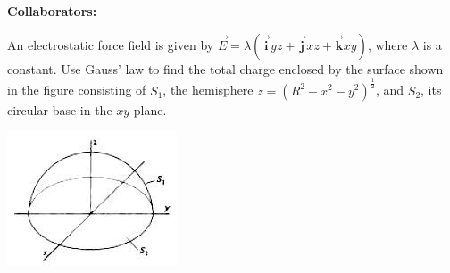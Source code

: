 \documentclass[11pt,letterpaper,boxed]{hmcpset}
\begin{document}
	
	\noindent\textbf{Collaborators:} 
	
	
	\begin{problem}[Schey II-8] 
		An electrostatic force field is given by $\vec{E} = \lambda (\vec{\textbf{i}}yz + \vec{\textbf{j}}xz + \vec{\textbf{k}}xy)$, where $\lambda$ is a constant. Use Gauss' law to find the total charge enclosed by the surface shown in the figure consisting of $S_1$, the hemisphere $z = (R^2 - x^2 - y^2)^{\frac{1}{2}}$, and $S_2$, its circular base in the $xy$-plane.
		\begin{center}
			\includegraphics[scale=0.8]{51m3pic2.jpg}
		\end{center}
		
	\end{problem}
	
	\begin{solution}
		\vfill
	\end{solution}
	\newpage
\end{document}
